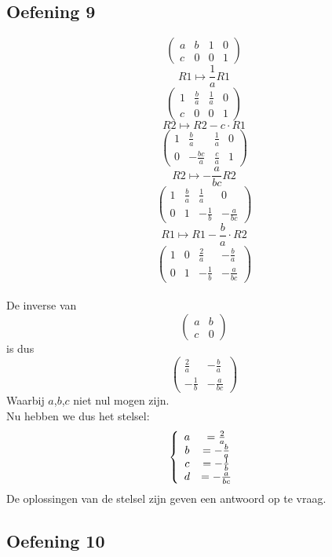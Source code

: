 \documentclass[lineaire_algebra_oplossingen.tex]{subfiles}
\begin{document}
\subsection{Oefening 9}

\[
\begin{pmatrix}
a & b & 1 & 0\\
c & 0 & 0 & 1
\end{pmatrix}
\]
\[ R1 \longmapsto \frac{1}{a} R1 \]
\[
\begin{pmatrix}
1 & \frac{b}{a} & \frac{1}{a} & 0\\
c & 0 & 0 & 1
\end{pmatrix}
\]
\[ R2 \longmapsto R2 - c \cdot R1\]
\[
\begin{pmatrix}
1 & \frac{b}{a} & \frac{1}{a} & 0\\
0 & -\frac{bc}{a} & \frac{c}{a} & 1
\end{pmatrix}
\]
\[ R2 \longmapsto -\frac{a}{bc} R2 \]
\[
\begin{pmatrix}
1 & \frac{b}{a} & \frac{1}{a} & 0\\
0 & 1 & -\frac{1}{b} & -\frac{a}{bc}
\end{pmatrix}
\]
\[ R1 \longmapsto R1 - \frac{b}{a} \cdot R2\]
\[
\begin{pmatrix}
1 & 0 & \frac{2}{a} & -\frac{b}{a}\\
0 & 1 & -\frac{1}{b} & -\frac{a}{bc}
\end{pmatrix}
\]
\\De inverse van 
\[
\begin{pmatrix}
a & b\\
c & 0
\end{pmatrix}
\]
is dus
\[
\begin{pmatrix}
\frac{2}{a} & -\frac{b}{a}\\
-\frac{1}{b} & -\frac{a}{bc}
\end{pmatrix}
\]
Waarbij $a$,$b$,$c$ niet nul mogen zijn.\\
Nu hebben we dus het stelsel:
\[
\left\lbrace
\begin{array}{c c}
a &= \frac{2}{a}\\
b &= -\frac{b}{a}\\
c &= -\frac{1}{b}\\
d &= -\frac{a}{bc}
\end{array}
\right.
\]
De oplossingen van de stelsel zijn geven een antwoord op te vraag.

\subsection{Oefening 10}
\end{document}
